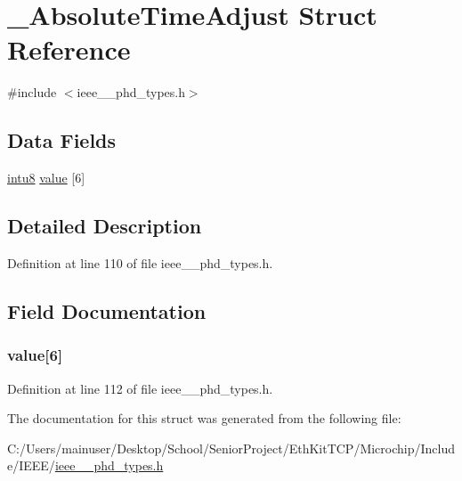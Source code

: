 \hypertarget{struct___absolute_time_adjust}{}\section{\+\_\+\+Absolute\+Time\+Adjust Struct Reference}
\label{struct___absolute_time_adjust}


{\ttfamily \#include $<$ieee\+\_\+\_\+phd\+\_\+types.\+h$>$}

\subsection*{Data Fields}
\begin{DoxyCompactItemize}
\item 
\hyperlink{ieee__11073__phd__types_8h_ae21d5428a584a153613cbe335630d3f4}{intu8} \hyperlink{struct___absolute_time_adjust_a3da66760c2b18f2f24c47b89c7b0a568}{value} \mbox{[}6\mbox{]}
\end{DoxyCompactItemize}


\subsection{Detailed Description}


Definition at line 110 of file ieee\+\_\+\_\+phd\+\_\+types.\+h.



\subsection{Field Documentation}
\hypertarget{struct___absolute_time_adjust_a3da66760c2b18f2f24c47b89c7b0a568}{}
\subsubsection[{value}]{ value\mbox{[}6\mbox{]}}\label{struct___absolute_time_adjust_a3da66760c2b18f2f24c47b89c7b0a568}


Definition at line 112 of file ieee\+\_\+\_\+phd\+\_\+types.\+h.



The documentation for this struct was generated from the following file\+:\begin{DoxyCompactItemize}
\item 
C\+:/\+Users/mainuser/\+Desktop/\+School/\+Senior\+Project/\+Eth\+Kit\+T\+C\+P/\+Microchip/\+Include/\+I\+E\+E\+E/\hyperlink{ieee__11073__phd__types_8h}{ieee\+\_\+\_\+phd\+\_\+types.\+h}\end{DoxyCompactItemize}
